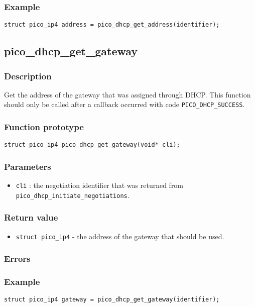 \subsubsection*{Example}
\begin{verbatim}
struct pico_ip4 address = pico_dhcp_get_address(identifier);
\end{verbatim}


\subsection{pico\_dhcp\_get\_gateway}

\subsubsection*{Description}
Get the address of the gateway that was assigned through DHCP. This function should only be called after a callback occurred with code \texttt{PICO\_DHCP\_SUCCESS}. 

\subsubsection*{Function prototype}
\texttt{struct pico\_ip4 pico\_dhcp\_get\_gateway(void* cli);}

\subsubsection*{Parameters}
\begin{itemize}
\item \texttt{cli} : the negotiation identifier that was returned from \texttt{pico\_dhcp\_initiate\_negotiations}.
\end{itemize}

\subsubsection*{Return value}
\begin{itemize}
\item \texttt{struct pico\_ip4} - the address of the gateway that should be used. 
\end{itemize}

\subsubsection*{Errors}

\subsubsection*{Example}
\begin{verbatim}
struct pico_ip4 gateway = pico_dhcp_get_gateway(identifier);
\end{verbatim}
